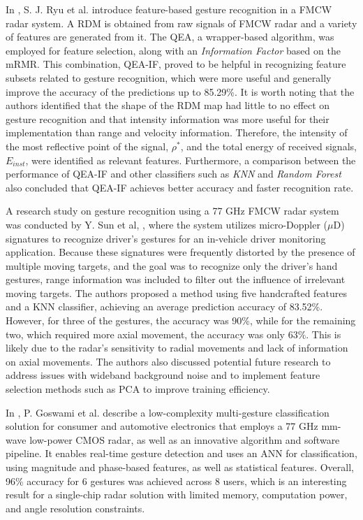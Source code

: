  In \cite{SOA_FMCWtempofeature}, S. J. Ryu et al. introduce feature-based gesture recognition in a \gls{FMCW} radar system. A \gls{RDM} is obtained from raw signals of FMCW radar and a variety of features are generated from it. The \gls{QEA}, a wrapper-based algorithm, was employed for feature selection, along with an \textit{Information Factor} based on the \gls{mRMR}. This combination, \gls{QEA-IF}, proved to be helpful in recognizing feature subsets related to gesture recognition, which were more useful and generally improve the accuracy of the predictions up to 85.29\%. It is worth noting that the authors identified that the shape of the \gls{RDM} map had little to no effect on gesture recognition and that intensity information was more useful for their implementation than range and velocity information. Therefore, the intensity of the most reflective point of the signal, $\rho^*$, and the total energy of received signals, $E_{inst}$, were identified as relevant features. Furthermore, a comparison between the performance of \gls{QEA-IF} and other classifiers such as \textit{KNN} and \textit{Random Forest} also concluded that QEA-IF achieves better accuracy and faster recognition rate.

 A research study on gesture recognition using a 77 GHz FMCW radar system was conducted by Y. Sun et al, \cite{SOA_microDoppler_fmcw}, where the system utilizes micro-Doppler ($\mu$D) signatures to recognize driver's gestures for an in-vehicle driver monitoring application. Because these signatures were frequently distorted by the presence of multiple moving targets, and the goal was to recognize only the driver's hand gestures, range information was included to filter out the influence of irrelevant moving targets. 
The authors proposed a method using five handcrafted features and a \gls{KNN} classifier, achieving an average prediction accuracy of 83.52\%. However, for three of the gestures, the accuracy was 90\%, while for the remaining two, which required more axial movement, the accuracy was only 63\%. This is likely due to the radar's sensitivity to radial movements and lack of information on axial movements. The authors also discussed potential future research to address issues with wideband background noise and to implement feature selection methods such as PCA to improve training efficiency.

In \cite{SOA_Magnitude_Phase_Features}, P. Goswami et al. describe a low-complexity multi-gesture classification solution for consumer and automotive electronics that employs a 77 GHz mm-wave low-power CMOS radar, as well as an innovative algorithm and software pipeline. It enables real-time gesture detection and uses an \gls{ANN} for classification, using magnitude and phase-based features, as well as statistical features.  Overall, 96\% accuracy for 6 gestures was achieved across 8 users, which is an interesting result for a single-chip radar solution with limited memory, computation power, and angle resolution constraints. 

